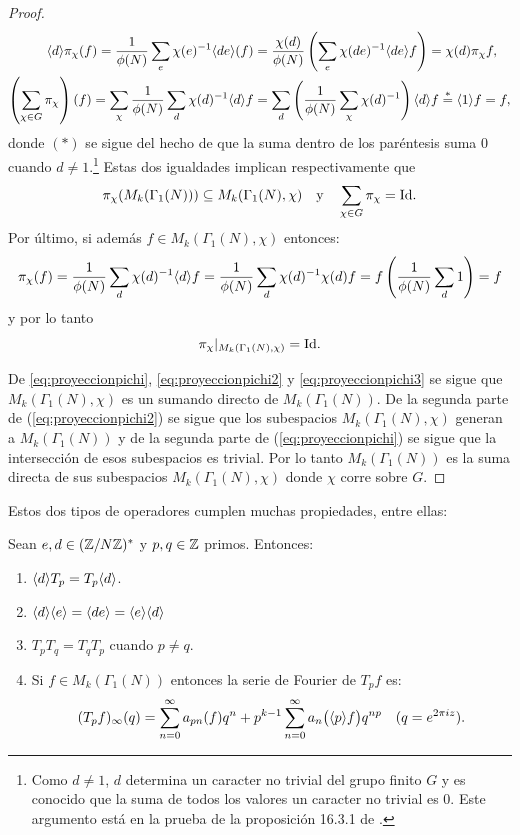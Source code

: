 \begin{proof}
\begin{align*}
    \langle d \rangle\pi_{\chi}(f)=\frac{1}{\phi(N)}\sum_e\chi(e)^{-1}\langle de \rangle(f)
    &=\frac{\chi(d)}{\phi(N)}\left( \sum_e\chi(de)^{-1}\langle de \rangle f \right)=\chi(d)\pi_{\chi}f,\\
    \left( \sum_{\chi\in G}\pi_{\chi} \right)(f)=\sum_{\chi}\frac{1}{\phi(N)}\sum_d\chi(d)^{-1}\langle d \rangle f
    &=\sum_d\left( \frac{1}{\phi(N)}\sum_{\chi}\chi(d)^{-1} \right)\langle d \rangle f\overset{*}{=}\langle 1 \rangle f=f,
  \end{align*}
  donde $(*)$ se sigue del hecho de que la suma dentro de los par\'entesis suma 0 cuando $d\neq1$.\footnote{Como
    $d\neq1$, $d$ determina un caracter no trivial del grupo finito $G$ y es conocido que la suma de todos los
    valores un caracter no trivial es 0. Este argumento est\'a en la prueba de la proposici\'on 16.3.1 de
    \cite{IrelandRosenACITMNT}.}
  Estas dos igualdades implican respectivamente que
  \begin{equation}
    \label{eq:proyeccionpichi2}
    \pi_{\chi}(M_k(\Gamma_1(N)))\subseteq M_k(\Gamma_1(N),\chi) \quad\text{y}\quad
    \sum_{\chi\in G}\pi_{\chi}=\mathrm{Id}.
  \end{equation}
  Por \'ultimo, si adem\'as $f\in M_k(\Gamma_1(N),\chi)$ entonces:
  \[
    \pi_{\chi}(f)=\frac{1}{\phi(N)}\sum_d\chi(d)^{-1}\langle d \rangle f=
    \frac{1}{\phi(N)}\sum_d\chi(d)^{-1}\chi(d)f=f\left( \frac{1}{\phi(N)}\sum_d1 \right)=f
  \]
  y por lo tanto
  \begin{equation}\label{eq:proyeccionpichi3}
    \pi_{\chi}|_{M_{k}(\Gamma_1(N),\chi)}=\mathrm{Id}.
  \end{equation}

  De \eqref{eq:proyeccionpichi}, \eqref{eq:proyeccionpichi2}  y \eqref{eq:proyeccionpichi3} se sigue
  que $M_k(\Gamma_1(N),\chi)$ es un sumando directo de $M_k(\Gamma_1(N))$. De la segunda parte de
  (\ref{eq:proyeccionpichi2}) se sigue que los subespacios $M_k(\Gamma_1(N),\chi)$ generan a
  $M_k(\Gamma_1(N))$ y de la segunda parte de (\ref{eq:proyeccionpichi}) se sigue que la
  intersecci\'on de esos subespacios es trivial. Por lo tanto $M_k(\Gamma_1(N))$ es la suma directa
  de sus subespacios $M_k(\Gamma_1(N),\chi)$ donde $\chi$ corre sobre $G$.
\end{proof}

Estos dos tipos de operadores cumplen muchas propiedades, entre ellas:

\begin{prop}\label{prop:opdeHecke} Sean $e,d\in(\mathbb{Z}/N\mathbb{Z})^*$ y $p,q\in\mathbb{Z}$ primos. Entonces:
  \begin{enumerate}[label=\roman*)]
  \item $\langle d \rangle T_p=T_p\langle d \rangle$.
  \item $\langle d \rangle\langle e \rangle=\langle de \rangle=\langle e \rangle\langle d \rangle$
  \item $T_pT_q=T_qT_p$ cuando $p\neq q$.
  \item\label{prop:FourieropdeHecke} Si $f\in M_k(\Gamma_1(N))$ entonces la serie de
    Fourier de $T_pf$ es:
    \[
      (T_pf)_{\infty}(q)=
      \sum_{n=0}^{\infty}a_{pn}(f)q^n+p^{k-1}\sum_{n=0}^{\infty}a_n\big(\langle p \rangle f\big)q^{np}\quad
      (q=e^{2\pi i z}).
    \]
  \end{enumerate}
\end{prop}

